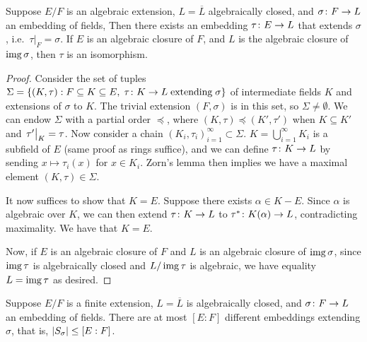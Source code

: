 \begin{proposition}\label{prop:algebraic-extension-hom}
    Suppose \(E/F\) is an algebraic extension,
    \(L = \overline{L}\) algebraically closed,
    and \(\sigma\colon F\to L\) an embedding of fields,
    Then there exists an embedding \(\tau\colon E\to L\) that extends \(\sigma\),
    i.e.\ \(\tau\vert_F = \sigma\).
    If \(E\) is an algebraic closure of \(F\),
    and \(L\) is the algebraic closure of \(\operatorname{img}\sigma\),
    then \(\tau\) is an isomorphism.
\end{proposition}
\begin{proof}
    Consider the set of tuples \(\Sigma = \{(K,\tau): F \subseteq K \subseteq E,\; \tau\colon K\to L\;\text{extending}\;\sigma\}\)
    of intermediate fields \(K\) and extensions of \(\sigma\) to \(K\).
    The trivial extension \((F,\sigma)\) is in this set, so \(\Sigma \neq \emptyset\).
    We can endow \(\Sigma\) with a partial order \(\preceq\),
    where \((K,\tau) \preceq (K',\tau')\) when \(K \subseteq K'\) and \(\eval{\tau'}_K = \tau\).
    Now consider a chain \({(K_i,\tau_i)}_{i=1}^\infty \subset \Sigma\).
    \(K = \bigcup_{i=1}^\infty K_i\) is a subfield of \(E\) (same proof as rings suffice),
    and we can define \(\tau\colon K\to L\) by sending \(x \mapsto \tau_i(x)\) for \(x \in K_i\).
    Zorn's lemma then implies we have a maximal element \((K,\tau) \in \Sigma\).

    It now suffices to show that \(K = E\).
    Suppose there exists \(\alpha \in K - E\).
    Since \(\alpha\) is algebraic over \(K\),
    we can then extend \(\tau\colon K\to L\) to \(\tau^\ast\colon K(\alpha)\to L\),
    contradicting maximality.
    We have that \(K = E\).

    Now, if \(E\) is an algebraic closure of \(F\) and \(L\) is an algebraic closure of \(\operatorname{img}\sigma\),
    since \(\operatorname{img}\tau\) is algebraically closed and \(L/\operatorname{img}\tau\) is algebraic,
    we have equality \(L = \operatorname{img}\tau\) as desired.
\end{proof}
\begin{proposition}\label{prop:algebraic-extension-hom-count-bound}
    Suppose \(E/F\) is a finite extension,
    \(L = \overline{L}\) is algebraically closed,
    and \(\sigma\colon F\to L\) an embedding of fields.
    There are at most \([E:F]\) different embeddings extending \(\sigma\),
    that is, \(\abs{S_\sigma} \leq [E:F]\).
\end{proposition}
